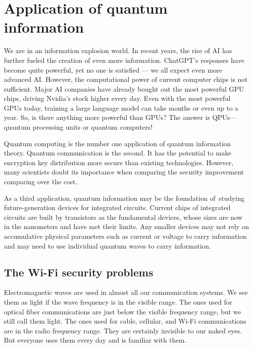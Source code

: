 \documentclass[oneside, letter, 12pt]{book}
\begin{document}
\section{Application of quantum information}
We are in an information explosion world. In recent years, the rise of AI has further fueled the creation of even more information. ChatGPT’s responses have become quite powerful, yet no one is satisfied — we all expect even more advanced AI. However, the computational power of current computer chips is not sufficient. Major AI companies have already bought out the most powerful GPU chips, driving Nvidia’s stock higher every day. Even with the most powerful GPUs today, training a large language model can take months or even up to a year. So, is there anything more powerful than GPUs? The answer is QPUs—quantum processing units or quantum computers!

Quantum computing is the number one application of quantum information theory. Quantum communication is the second. It has the potential to make encryption key distribution more secure than existing technologies. However, many scientists doubt its importance when comparing the security improvement comparing over the cost.

As a third application, quantum information may be the foundation of studying future-generation devices for integrated circuits. Current chips of integrated circuits are built by transistors as the fundamental devices, whose sizes are now in the nanometers and have met their limits. Any smaller devices may not rely on accumulative physical parameters such as current or voltage to carry information and may need to use individual quantum waves to carry information.

\subsection{The Wi-Fi security problems}\label{Sec-example-wifi}
Electromagnetic waves are used in almost all our communication systems. We see them as light if the wave frequency is in the visible range. The ones used for optical fiber communications are just below the visible frequency range, but we still call them light. The ones used for cable, cellular, and Wi-Fi communications are in the radio frequency range. They are certainly invisible to our naked eyes. But everyone uses them every day and is familiar with them.
\end{document}

